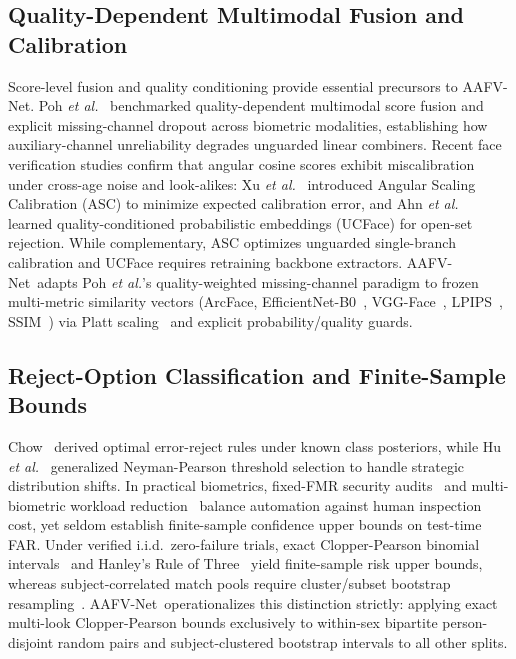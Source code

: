 \documentclass[journal]{IEEEtran}
\newcommand{\sys}{AAFV-Net}
\begin{document}
\subsection{Quality-Dependent Multimodal Fusion and Calibration}
Score-level fusion and quality conditioning provide essential precursors to \sys. Poh \emph{et al.}~\cite{poh2009quality} benchmarked quality-dependent multimodal score fusion and explicit missing-channel dropout across biometric modalities, establishing how auxiliary-channel unreliability degrades unguarded linear combiners. Recent face verification studies confirm that angular cosine scores exhibit miscalibration under cross-age noise and look-alikes: Xu \emph{et al.}~\cite{xu2024asc} introduced Angular Scaling Calibration (ASC) to minimize expected calibration error, and Ahn \emph{et al.}~\cite{ahn2024ucface} learned quality-conditioned probabilistic embeddings (UCFace) for open-set rejection. While complementary, ASC optimizes unguarded single-branch calibration and UCFace requires retraining backbone extractors. \sys\ adapts Poh \emph{et al.}'s quality-weighted missing-channel paradigm to frozen multi-metric similarity vectors (ArcFace, EfficientNet-B0~\cite{tan2019efficientnet}, VGG-Face~\cite{parkhi2015vgg}, LPIPS~\cite{zhang2018lpips}, SSIM~\cite{wang2004ssim}) via Platt scaling~\cite{platt1999} and explicit probability/quality guards.

\subsection{Reject-Option Classification and Finite-Sample Bounds}
Chow~\cite{chow1970reject} derived optimal error-reject rules under known class posteriors, while Hu \emph{et al.}~\cite{hu2025neyman} generalized Neyman-Pearson threshold selection to handle strategic distribution shifts. In practical biometrics, fixed-FMR security audits~\cite{otroshi2024inversion} and multi-biometric workload reduction~\cite{osorioroig2024indexing} balance automation against human inspection cost, yet seldom establish finite-sample confidence upper bounds on test-time FAR. Under verified i.i.d.\ zero-failure trials, exact Clopper-Pearson binomial intervals~\cite{clopper1934} and Hanley's Rule of Three~\cite{hanley1983rule3} yield finite-sample risk upper bounds, whereas subject-correlated match pools require cluster/subset bootstrap resampling~\cite{bolle2004subsets,schuckers2010book}. \sys\ operationalizes this distinction strictly: applying exact multi-look Clopper-Pearson bounds exclusively to within-sex bipartite person-disjoint random pairs and subject-clustered bootstrap intervals to all other splits.
\end{document}
